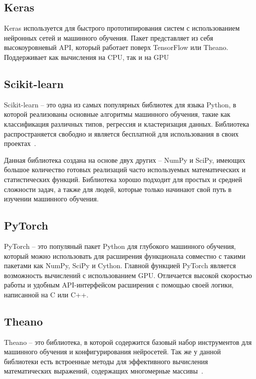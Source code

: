 \subsection{Keras}

Keras используется для быстрого прототипирования систем с использованием нейронных сетей и машинного обучения. Пакет представляет из себя высокоуровневый API, который работает поверх TensorFlow или Theano. Поддерживает как вычисления на CPU, так и на GPU

\subsection{Scikit-learn}

Scikit-learn -- это одна из самых популярных библиотек для языка Python, в которой реализованы основные алгоритмы машинного обучения, такие как классификация различных типов, регрессия и кластеризация данных. Библиотека распространяется свободно и является бесплатной для использования в своих проектах~\cite{rashka}.


Данная библиотека создана на основе двух других -- NumPy и SciPy, имеющих большое количество готовых реализаций часто используемых математических и статистических функций. Библиотека хорошо подходит для простых и средней сложности задач, а также для людей, которые только начинают свой путь в изучении машинного обучения.

\subsection{PyTorch}

PyTorch -- это популяный пакет Python для глубокого машинного обучения, который можно использовать для расширения функционала совместно с такими пакетами как NumPy, SciPy и Cython. Главной функцией PyTorch является возможность вычислений с использованием GPU. Отличается высокой скоростью работы и удобным API-интерфейсом расширения с помощью своей логики, написанной на C или C++.

\subsection{Theano}
Theano -- это библиотека, в которой содержится базовый набор инструментов для машинного обучения и конфигурирования нейросетей. Так же у данной библиотеки есть встроенные методы для эффективного вычисления математических выражений, содержащих многомерные массивы~\cite{rashka}.


